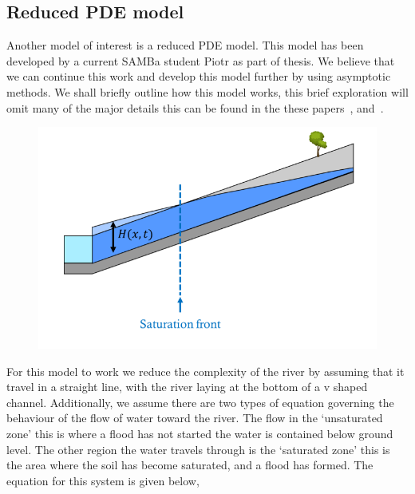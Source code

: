 \documentclass[11pt]{article}
\begin{document}
\subsection{Reduced PDE model}
Another model of interest is a reduced PDE model. This model has been developed by a current SAMBa student Piotr as part of thesis. 
We believe that we can continue this work and develop this model further by using asymptotic methods.
We shall briefly outline how this model works, this brief exploration will omit many of the major details this can be found in the these papers~\cite{pp1},\cite{pp2} and~\cite{pp3}.

\vspace{5pt}
\begin{minipage}{0.6\textwidth}
    \begin{figure}[H]%
    \centering
    \includegraphics[width=\textwidth]{Figs/Simple model.png}
    \label{fig:model}
    \end{figure}
\end{minipage}
\hspace{0.05\textwidth}
\begin{minipage}{0.3\textwidth}
    \qquad For this model to work we reduce the complexity of the river by assuming that it travel in a straight line, with the river laying at the bottom of a v shaped channel. Additionally, we assume there are two types of equation governing the behaviour of the flow of water toward the river. 
    The flow in the `unsaturated zone' this is where a flood has not started the water is contained below ground level. The other region the water travels through is the `saturated zone' this is the area where the soil has become saturated, and a flood has formed. The equation for this system is given below,
    
\end{minipage}
\end{document}
